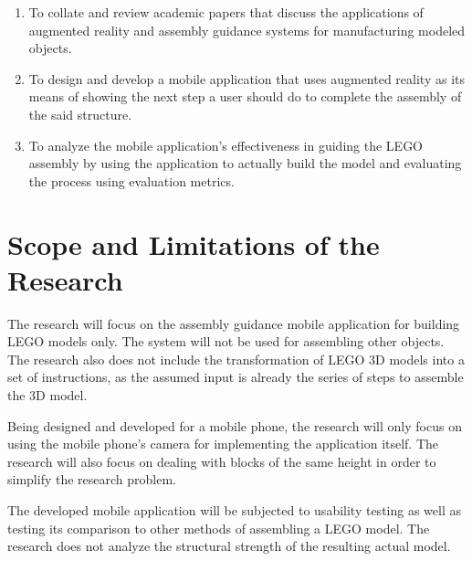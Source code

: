 \begin{enumerate}
   \item To collate and review academic papers that discuss the applications of augmented reality and assembly guidance systems for manufacturing modeled objects.
	\item To design and develop a mobile application that uses augmented reality as its means of showing the next step a user should do to complete the assembly of the said structure.
	\item To analyze the mobile application's effectiveness in guiding the LEGO assembly by using the application to actually build the model and evaluating the process using evaluation metrics.
\end{enumerate}


\section{Scope and Limitations of the Research}
\label{sec:scopelimitations}

The research will focus on the assembly guidance mobile application for building LEGO models only. The system will not be used for assembling other objects. The research also does not include the transformation of LEGO 3D models into a set of instructions, as the assumed input is already the series of steps to assemble the 3D model.

Being designed and developed for a mobile phone, the research will only focus on using the mobile phone's camera for implementing the application itself. The research will also focus on dealing with blocks of the same height in order to simplify the research problem.

The developed mobile application will be subjected to usability testing as well as testing its comparison to other methods of assembling a LEGO model. The research does not analyze the structural strength of the resulting actual model.

%

\begin{comment}

%
%
Generally, one paragraph should be allotted for each of your research objectives.

Each paragraph contains a brief overview of the concept/theory and the purpose of doing the associated objective.

Each paragraph also includes a description of the scope/limitation of your study.

* Please refer to the slides for examples.

\end{comment}


